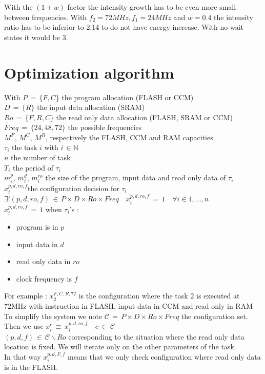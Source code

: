 \documentclass[conference]{IEEEtran}
\begin{document}
With the $(1+w)$ factor the intensity growth has to be even more small between
frequencies. With $f_2 = 72 MHz, f_1 = 24 MHz$ and $w = 0.4$ the intensity ratio
has to be inferior to 2.14 to do not have energy increase. With no wait states it would be 3.

\section{Optimization algorithm}

With $P\,=\,\{F,C\}$ the program allocation (FLASH or CCM)\\
$D\,=\,\{R\}$ the input data allocation (SRAM)\\
$Ro\,=\,\{F,R,C\}$ the read only data allocation (FLASH, SRAM or CCM)\\
$Freq\,=\,\{24,48,72\}$ the possible frequencies\\
$M^F$, $M^C$, $M^R$, respectively the FLASH, CCM and RAM capacities \\
$\tau_i$ the task $i$ with $i \, \in \mathbb{N}$\\
$n$ the number of task\\
$T_i$ the period of $\tau_i$\\
$m_i^p,\, m_i^d,\, m_i^{ro}$ the size of the program, input data and read only
data of $\tau_i$ \\
$x_i^{p,d,ro,f}$the configuration decision for $\tau_i$\\
$\exists!(p,d,ro,f)\,\in\,P \times D \times Ro \times Freq \quad
x_i^{p,d,ro,f}\,=\,1\quad \forall i \in 1,\ldots,n$\\
$x_i^{p,d,ro,f}\,=\,1$ when $\tau_i$'s : 
\begin{itemize}
    \item program is in $p$ 
    \item input data in $d$
    \item read only data in $ro$
    \item clock frequency is $f$
\end{itemize}
For example : $x_2^{F,C,R,72}$ is the configuration where the task 2 is executed
at 72MHz with instruction in FLASH, input data in CCM and read only in RAM \\

To simplify the system we note $\mathcal{C} \, = \, P \times D \times Ro \times
Freq$ the configuration set.\\
Then we use $x_i^c\,\equiv\, x_i^{p,d,ro,f}\quad c\ \in \ \mathcal{C}$\\
$({p},{d},{f})\,\in\,\mathcal{C}\backslash{Ro}$ corresponding to the situation
where the read only data location is fixed. We will
iterate only on the other parameters of the task.\\
In that way $x_i^{{p},{d},{F},{f}}$ means that we only check configuration where
read only data is in the FLASH.
\end{document}
